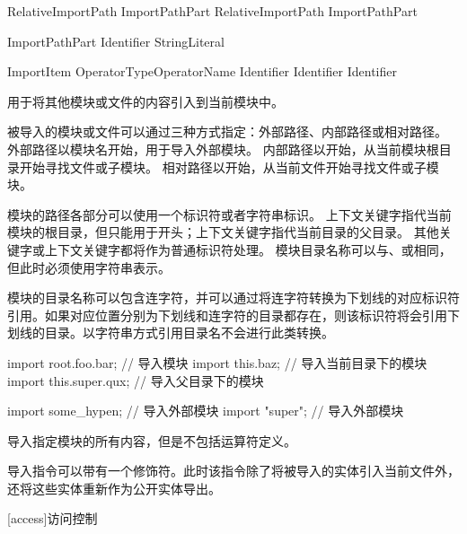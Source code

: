 \begin{bnf}{RelativeImportPath}
      ImportPathPart \br
    RelativeImportPath  ImportPathPart
\end{bnf}

\begin{bnf}{ImportPathPart}
    Identifier \br
    StringLiteral \br
\end{bnf}

\begin{bnf}{ImportItem}
    \terminal{*} \br
     \br
     OperatorType\bnfq OperatorName \br
    Identifier \br
    Identifier  Identifier
\end{bnf}

\pnum
{}用于将其他模块或文件的内容引入到当前模块中。

\pnum
被导入的模块或文件可以通过三种方式指定：外部路径、内部路径或相对路径。
外部路径以模块名开始，用于导入外部模块。
内部路径以开始，从当前模块根目录开始寻找文件或子模块。
相对路径以开始，从当前文件开始寻找文件或子模块。

\pnum
模块的路径各部分可以使用一个标识符或者字符串标识。
上下文关键字指代当前模块的根目录，但只能用于开头；上下文关键字指代当前目录的父目录。
其他关键字或上下文关键字都将作为普通标识符处理。
模块目录名称可以与、或相同，但此时必须使用字符串表示。

\pnum
模块的目录名称可以包含连字符，并可以通过将连字符转换为下划线的对应标识符引用。如果对应位置分别为下划线和连字符的目录都存在，则该标识符将会引用下划线的目录。以字符串方式引用目录名不会进行此类转换。

\enterexample
\begin{codeblock}
import root.foo.bar; // 导入模块
import this.baz; // 导入当前目录下的模块
import this.super.qux; // 导入父目录下的模块

import some_hypen; // 导入外部模块
import "super"; // 导入外部模块
\end{codeblock}
\exitexample

\pnum
\tcode{*}导入指定模块的所有内容，但是不包括运算符定义。

\pnum
导入指令可以带有一个修饰符。此时该指令除了将被导入的实体引入当前文件外，还将这些实体重新作为公开实体导出。

[access]{访问控制}

